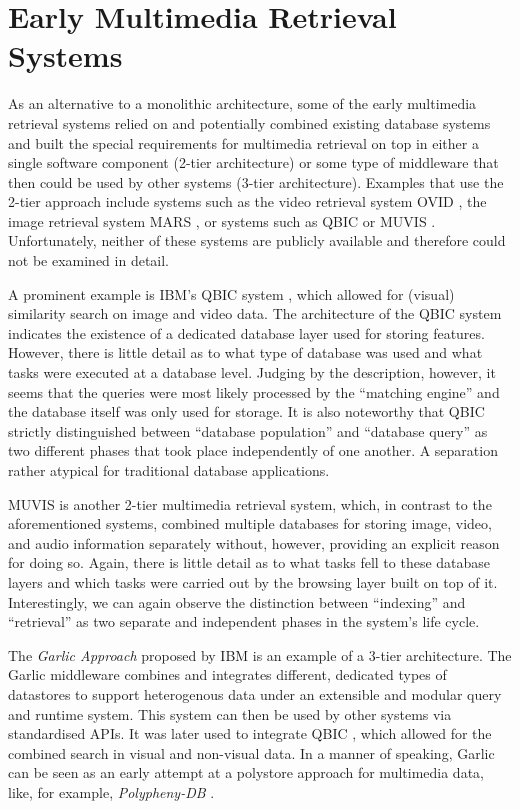 \section{Early Multimedia Retrieval Systems}

As an alternative to a monolithic architecture, some of the early multimedia retrieval systems relied on and potentially combined existing database systems and built the special requirements for multimedia retrieval on top in either a single software component (2-tier architecture) or some type of middleware that then could be used by other systems (3-tier architecture). Examples that use the 2-tier approach include systems such as the video retrieval system OVID \cite{Oomoto:1993OVID}, the image retrieval system MARS \cite{Rui:1997Content}, or systems such as QBIC \cite{Flickner:1995Query} or MUVIS \cite{Kiranyaz:2003Muvis}. Unfortunately, neither of these systems are publicly available and therefore could not be examined in detail.

A prominent example is IBM's QBIC system \cite{Flickner:1995Query}, which allowed for (visual) similarity search on image and video data. The architecture of the QBIC system indicates the existence of a dedicated database layer used for storing features. However, there is little detail as to what type of database was used and what tasks were executed at a database level. Judging by the description, however, it seems that the queries were most likely processed by the ``matching engine'' and the database itself was only used for storage. It is also noteworthy that QBIC strictly distinguished between ``database population'' and ``database query'' as two different phases that took place independently of one another. A separation rather atypical for traditional database applications.

MUVIS \cite{Kiranyaz:2003Muvis} is another 2-tier multimedia retrieval system, which, in contrast to the aforementioned systems, combined multiple databases for storing image, video, and audio information separately without, however, providing an explicit reason for doing so. Again, there is little detail as to what tasks fell to these database layers and which tasks were carried out by the browsing layer built on top of it. Interestingly, we can again observe the distinction between ``indexing'' and ``retrieval'' as two separate and independent phases in the system's life cycle.

The \emph{Garlic Approach} \cite{Carey:1995Towards} proposed by IBM is an example of a 3-tier architecture. The Garlic middleware combines and integrates different, dedicated types of datastores to support heterogenous data under an extensible and modular query and runtime system. This system can then be used by other systems via standardised APIs. It was later used to integrate QBIC \cite{Cody:1995Querying}, which allowed for the combined search in visual and non-visual data. In a manner of speaking, Garlic can be seen as an early attempt at a polystore approach for multimedia data, like, for example, \emph{Polypheny-DB} \cite{Vogt:2018Polypheny}. 

